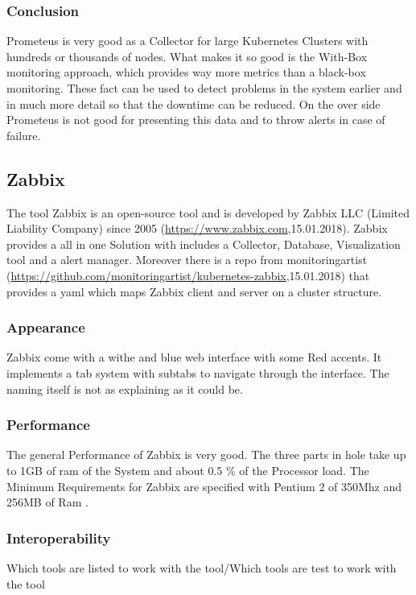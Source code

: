 \subsubsection{Conclusion}
Prometeus is very good as a Collector for large Kubernetes Clusters with hundreds or thousands of nodes. What makes it so good is the With-Box monitoring approach, which provides way more metrics than a black-box monitoring. These fact can be used to detect problems in the system earlier and in much more detail so that the downtime can be reduced. On the over side Prometeus is not good for presenting this data and to throw alerts in case of failure.

\subsection{Zabbix}
\label{Zabbix} %
\cite{Hernantes2015}
The tool Zabbix is an open-source tool and is developed by Zabbix LLC (Limited Liability Company) since 2005 (\url{https://www.zabbix.com},15.01.2018). Zabbix provides a all in one Solution with includes a Collector, Database, Visualization tool and a alert manager. Moreover there is a repo from monitoringartist (\url{https://github.com/monitoringartist/kubernetes-zabbix},15.01.2018) that provides a yaml which maps Zabbix client and server on a cluster structure.  
\subsubsection{Appearance}%
Zabbix come with a withe and blue web interface with some Red accents. It implements a tab system with subtabs to navigate through the interface. The naming itself is not as explaining as it could be.  
\subsubsection{Performance}
The general Performance of Zabbix is very good. The three parts in hole take up to 1GB of ram of the System and about 0.5 \% of the Processor load. The Minimum Requirements for Zabbix are specified with Pentium 2 of 350Mhz and 256MB of Ram \cite{Marik2014}.
\subsubsection{Interoperability}
Which tools are listed to work with the tool/Which tools are test to work with the tool
